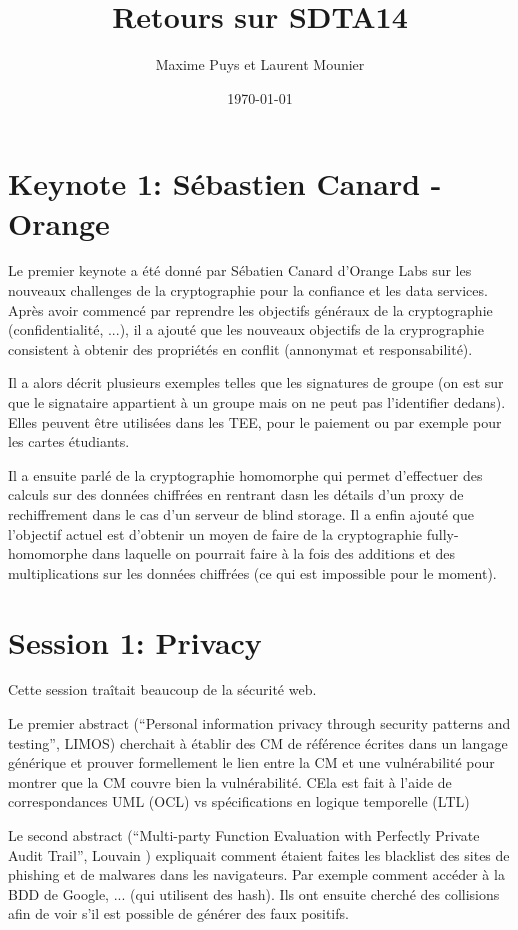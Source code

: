 \documentclass{article}
\title{Retours sur SDTA14}
\author{Maxime Puys et Laurent Mounier}
\date{\today}
\begin{document}
\maketitle

\section{Keynote 1: S\'ebastien Canard - Orange}

Le premier keynote a \'et\'e donn\'e par S\'ebatien Canard d'Orange Labs sur les nouveaux challenges de la cryptographie pour la confiance et les data services. Apr\`es avoir commenc\'e par reprendre les objectifs g\'en\'eraux de la cryptographie (confidentialit\'e, ...), il a ajout\'e que les nouveaux objectifs de la cryprographie consistent \`a obtenir des propri\'et\'es en conflit (annonymat et responsabilit\'e).

Il a alors d\'ecrit plusieurs exemples telles que les signatures de groupe (on est sur que le signataire appartient \`a un groupe mais on ne peut pas l'identifier dedans). Elles peuvent \^etre utilis\'ees dans les TEE, pour le paiement ou par exemple pour les cartes \'etudiants.

Il a ensuite parl\'e de la cryptographie homomorphe qui permet d'effectuer des calculs sur des donn\'ees chiffr\'ees en rentrant dasn les d\'etails d'un proxy de rechiffrement dans le cas d'un serveur de blind storage. Il a enfin ajout\'e que l'objectif actuel est d'obtenir un moyen de faire de la cryptographie fully-homomorphe dans laquelle on pourrait faire \`a la fois des additions et des multiplications sur les donn\'ees chiffr\'ees (ce qui est impossible pour le moment).


\section{Session 1: Privacy}

Cette session tra\^itait beaucoup de la s\'ecurit\'e web. 

Le premier abstract (``Personal information privacy through security patterns and testing'', LIMOS) cherchait \`a \'etablir des CM de r\'ef\'erence \'ecrites dans un langage g\'en\'erique et prouver formellement le lien entre la CM et une vuln\'erabilit\'e pour montrer que la CM couvre bien la vuln\'erabilit\'e. CEla est fait \`a l'aide de correspondances UML (OCL) vs sp\'ecifications en logique temporelle (LTL)

Le second abstract (``Multi-party Function Evaluation with Perfectly Private Audit Trail'', Louvain ) expliquait comment \'etaient faites les blacklist des sites de phishing et de malwares dans les navigateurs. Par exemple comment acc\'eder \`a la BDD de Google, ... (qui utilisent des hash). Ils ont ensuite cherch\'e des collisions afin de voir s'il est possible de g\'en\'erer des faux positifs.
\end{document}
